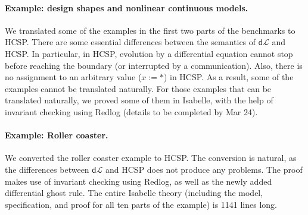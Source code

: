 \documentclass[runningheads,a4paper]{llncs}
\newcommand{\dL}{\mathsf{d}\mathcal{L}}
\begin{document}
\paragraph{Example: design shapes and nonlinear continuous models.}

We translated some of the examples in the first two parts of the
benchmarks to HCSP. There are some essential differences between the
semantics of $\dL$ and HCSP. In particular, in HCSP, evolution by a
differential equation cannot stop before reaching the boundary (or
interrupted by a communication). Also, there is no assignment to an
arbitrary value ($x := *$) in HCSP. As a result, some of the examples
cannot be translated naturally. For those examples that can be
translated naturally, we proved some of them in Isabelle, with the
help of invariant checking using Redlog (details to be completed by
Mar 24).

\paragraph{Example: Roller coaster.}

We converted the roller coaster example \cite{coasterx} to HCSP. The
conversion is natural, as the differences between $\dL$ and HCSP does
not produce any problems. The proof makes use of invariant checking
using Redlog, as well as the newly added differential ghost rule. The
entire Isabelle theory (including the model, specification, and proof
for all ten parts of the example) is 1141 lines long.




\end{document}
